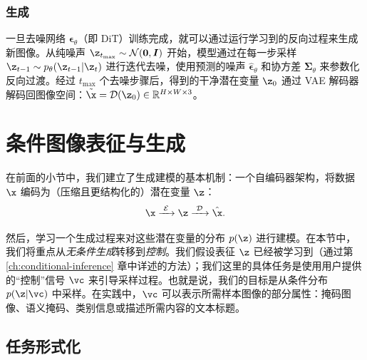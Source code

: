 \documentclass[../../book-main_zh.tex]{subfiles}
\begin{document}
\subsubsection{生成}
一旦去噪网络 $\boldsymbol{\epsilon}_\theta$（即 DiT）训练完成，就可以通过运行学习到的反向过程来生成新图像。从纯噪声 $\z_{t_{\max}} \sim \mathcal{N}(\boldsymbol{0}, \boldsymbol{I})$ 开始，模型通过在每一步采样 $\z_{t-1} \sim p_\theta(\z_{t-1} | \z_t)$ 进行迭代去噪，使用预测的噪声 $\hat{\boldsymbol{\epsilon}}_\theta$ 和协方差 $\boldsymbol{\Sigma}_\theta$ 来参数化反向过渡。经过 $t_{\max}$ 个去噪步骤后，得到的干净潜在变量 $\z_0$ 通过 VAE 解码器解码回图像空间：$\tilde{\x} = \mathcal{D}(\z_0) \in \mathbb{R}^{H \times W \times 3}$。







\section{条件图像表征与生成}
\label{sec:cond_gen}

在前面的小节中，我们建立了生成建模的基本机制：一个自编码器架构，将数据 $\x$ 编码为（压缩且更结构化的）潜在变量 $\z$：
\begin{equation}
\x\xrightarrow{\hspace{1mm} \mathcal{E} \hspace{1mm}} \z
\xrightarrow{\hspace{1mm} \mathcal{D} \hspace{1mm}} \hat{\x}.
\end{equation}

然后，学习一个生成过程来对这些潜在变量的分布 $p(\z)$ 进行建模。在本节中，我们将重点从\textit{无条件生成}转移到\textit{控制}。我们假设表征 $\z$ 已经被学习到（通过第 \ref{ch:conditional-inference} 章中详述的方法）；我们这里的具体任务是使用用户提供的“控制”信号 $\vc$ 来引导采样过程。也就是说，我们的目标是从条件分布 $p(\z | \vc)$ 中采样。在实践中，$\vc$ 可以表示所需样本图像的部分属性：掩码图像、语义掩码、类别信息或描述所需内容的文本标题。

\subsection{任务形式化}
\label{subsec:cond_problem}
\end{document}
